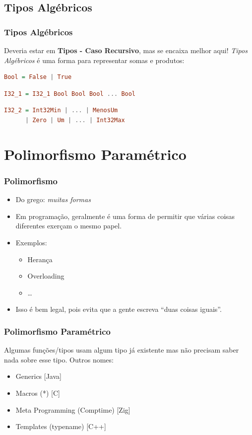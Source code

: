 \documentclass{beamer}
\begin{document}
\subsection{Tipos Algébricos}
\begin{frame}[fragile]
    \frametitle{Tipos Algébricos}
    Deveria estar em \textbf{Tipos - Caso Recursivo},
    mas se encaixa melhor aqui!
    \vfill
    \emph{Tipos Algébricos}
    é uma forma para representar somas e produtos:
    \vfill
    \begin{lstlisting}[language=Haskell]
Bool = False | True
    \end{lstlisting}
    \vfill
    \begin{lstlisting}[language=Haskell]
I32_1 = I32_1 Bool Bool Bool ... Bool
    \end{lstlisting}
    \vfill
    \begin{lstlisting}[language=Haskell]
I32_2 = Int32Min | ... | MenosUm
      | Zero | Um | ... | Int32Max
    \end{lstlisting}
\end{frame}

\section{Polimorfismo Paramétrico}
\begin{frame}
    \frametitle{Polimorfismo}
    \begin{itemize}
        \item Do grego: \emph{muitas formas}
            \vfill
        \item Em programação, geralmente é uma forma
            de permitir que várias coisas diferentes
            exerçam o mesmo papel.
            \vfill
        \item Exemplos:
            \begin{itemize}
                \item Herança
                \item Overloading
                \item \dots
            \end{itemize}
            \vfill
        \item Isso é bem legal,
            pois evita que a gente escreva
            ``duas coisas iguais''.
    \end{itemize}
\end{frame}

\begin{frame}
    \frametitle{Polimorfismo Paramétrico}
    Algumas funções/tipos usam algum tipo já existente
    mas não precisam saber nada sobre esse tipo.
    \vfill
    Outros nomes:
    \begin{itemize}
        \item Generics [Java]
        \item Macros (*) [C]
        \item Meta Programming (Comptime) [Zig]
        \item Templates (typename) [C++]
    \end{itemize}
\end{frame}
\end{document}
